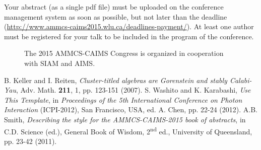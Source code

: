 \documentclass[11pt]{article}
\begin{document}
Your abstract (as a single pdf file) must be uploaded on the conference management
system as soon as possible, but not later than the deadline (\url{http://www.ammcs-caims2015.wlu.ca/deadlines-payment/}). At least one author must be registered for your talk to be included in the program of the conference.
\begin{figure}[h]

\centerline{}

\caption{\footnotesize The 2015 AMMCS-CAIMS Congress is organized in cooperation with SIAM and AIMS. \normalsize}
\label{fig1}
\end{figure}

\begin{thebibliography}{00}
\setlength{\itemsep}{-1mm}
\footnotesize
{} B. Keller and I. Reiten, \textit{Cluster-titled algebras are Gorenstein and stably Calabi-Yau}, Adv. Math. \textbf{211}, 1, pp. 123-151 (2007).
 S. Washito and K. Karabashi, \textit{Use This Template}, in \textit{Proceedings of the 5th
International Conference on Photon Interaction} (ICPI-2012), San Francisco, USA, ed. A. Chen, pp. 22-24 (2012).
 A.B. Smith, \textit{Describing the style for the AMMCS-CAIMS-2015 book of abstracts}, in C.D. Science (ed.), General Book of Wisdom, 2\textsuperscript{nd} ed., University of Queensland, pp. 23-42 (2011).
\end{thebibliography}
\normalsize
\end{document}
